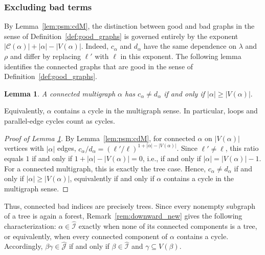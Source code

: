 \documentclass[11pt, letterpaper]{article}
\newtheorem{lemma}[theorem]{Lemma}
\numberwithin{equation}{section}
\newcommand{\goodI}{\widehat{\mathcal{I}}}
\newcommand{\goodJ}{\widehat{\mathcal{J}}}
\begin{document}
 \subsubsection*{Excluding bad terms}
By Lemma~\ref{lem:psm:cdM}, 
the distinction between good and bad graphs in the sense of Definition~\ref{def:good_graphs} is governed entirely by the exponent
$|\mathcal{C}(\alpha)|+|\alpha|-|V(\alpha)|$.
Indeed, $c_\alpha$ and $d_\alpha$ have the same dependence on $\lambda$ and $\rho$ and differ by replacing $\ell'$ with $\ell$ in this exponent. The following lemma identifies the connected graphs that are good in the sense of Definition~\ref{def:good_graphs}.

\begin{lemma}\label{lem:tree-uninformative}
A connected multigraph $\alpha$ has $c_\alpha\neq d_\alpha$ if and only if $|\alpha|\ge |V(\alpha)|.$
\end{lemma}
\noindent Equivalently, $\alpha$ contains a cycle in the multigraph sense. In particular, loops and parallel-edge cycles count as cycles.
\begin{proof}[Proof of Lemma \ref{lem:tree-uninformative}]
By Lemma~\ref{lem:psm:cdM}, for connected $\alpha$ on $|V(\alpha)|$ vertices with $|\alpha|$ edges,
$c_{\alpha}/d_{\alpha} = (\ell'/\ell)^{1+|\alpha|-|V(\alpha)|}$. Since $\ell'\neq \ell$, this ratio equals $1$ if and only if $1+|\alpha|-|V(\alpha)|=0$, i.e., if and only if $|\alpha|=|V(\alpha)|-1$. For a connected multigraph, this is exactly the tree case. Hence, $c_\alpha\neq d_\alpha$ if and only if $|\alpha|\ge |V(\alpha)|$, equivalently if and only if $\alpha$ contains a cycle in the multigraph sense.
\end{proof}

\noindent
Thus, connected bad indices are precisely trees. Since every nonempty subgraph of a tree is again a forest, Remark~\ref{rem:downward_new} gives the following characterization: $\alpha\in\goodI$ exactly when none of its connected components is a tree, or equivalently, when every connected component of $\alpha$ contains a cycle. Accordingly, $\beta\gamma\in\goodJ$ if and only if $\beta\in\goodI$ and $\gamma\subseteq V(\beta)$.
\end{document}
